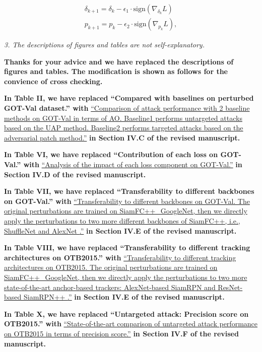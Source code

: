 \documentclass[12pt]{article}
\begin{document}
\begin{gather}
  \delta_{k+1} = \delta_{k} - \epsilon_1 \cdot \text{sign}(\nabla_{\delta_k}L)\\
  p_{k+1} = p_{k} - \epsilon_2 \cdot \text{sign}(\nabla_{p_k}L),
  \end{gather}

\textit{3. The descriptions of figures and tables are not self-explanatory.}

\textbf{Thanks for your advice and we have replaced the descriptions of figures and tables. The modification is shown as follows for the convience of cross checking.}

\textbf{In Table II, we have replaced ``Compared with baselines on perturbed GOT-Val dataset.'' with}
\uline{``Comparison of attack performance with 2 baseline methods on GOT-Val in terms of AO. Baseline1 performs untargeted attacks based on the UAP \cite{UAP} method. Baseline2 performs targeted attacks based on the adversarial patch \cite{patch} method.''}
\textbf{in Section IV.C of the revised manuscript.}

\textbf{In Table VI, we have replaced ``Contribution of each loss on GOT-Val.'' with}
\uline{``Analysis of the impact of each loss component on GOT-Val.''}
\textbf{in Section IV.D of the revised manuscript.}

\textbf{In Table VII, we have replaced ``Transferability to different backbones on GOT-Val.'' with}
\uline{``Transferability to different backbones on GOT-Val. The original perturbations are trained on SiamFC++\_GoogleNet, then we directly apply the perturbations to two more different backbones of SiamFC++, i.e., ShuffleNet \cite{ShuffleNet} and AlexNet \cite{AlexNet}.''}
\textbf{in Section IV.E of the revised manuscript.}

\textbf{In Table VIII, we have replaced ``Transferability to different tracking architectures on OTB2015.'' with}
\uline{``Transferability to different tracking architectures on OTB2015. The original perturbations are trained on SiamFC++\_GoogleNet, then we directly apply the perturbations to two more state-of-the-art anchor-based trackers: AlexNet-based SiamRPN \cite{SiamRPN} and ResNet-based SiamRPN++ \cite{SiamRPN++}.''}
\textbf{in Section IV.E of the revised manuscript.}

\textbf{In Table X, we have replaced ``Untargeted attack: Precision score on OTB2015.'' with}
\uline{``State-of-the-art comparison of untargeted attack performance on OTB2015 in terms of precision score.''}
\textbf{in Section IV.F of the revised manuscript.}
\end{document}
